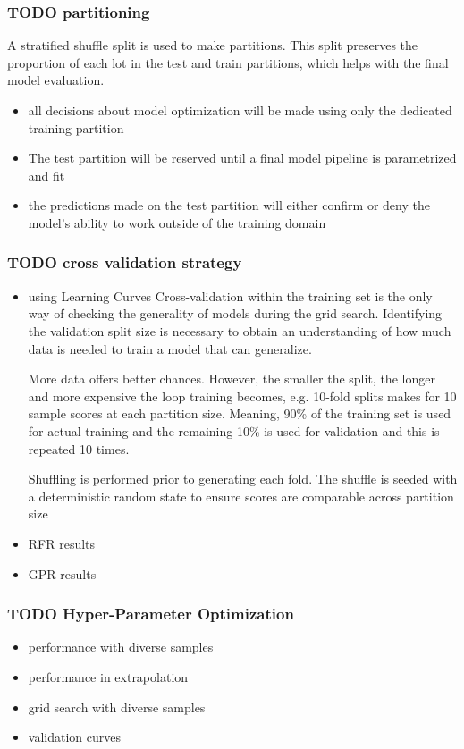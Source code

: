 \documentclass[aip, jmp, amsmath, amssymb]{revtex4-2}
\begin{document}
\subsubsection*{{\bfseries\sffamily TODO} partitioning}
\label{sec:orgfcd6ee8}
A stratified shuffle split is used to make partitions. This split
preserves the proportion of each \gls{lot} in the test and train
partitions, which helps with the final model evaluation.

\begin{itemize}
\item all decisions about model optimization will be made using only the
dedicated training partition
\item The test partition will be reserved until a final model pipeline is
parametrized and fit
\item the predictions made on the test partition will either confirm or
deny the model's ability to work outside of the training domain
\end{itemize}

\subsubsection*{{\bfseries\sffamily TODO} cross validation strategy}
\label{sec:org08b48c5}
\begin{itemize}
\item using Learning Curves
\label{sec:org18c93ee}
Cross-validation within the training set is the only way of checking
the generality of models during the grid search. Identifying the
validation split size is necessary to obtain an understanding of how
much data is needed to train a model that can generalize.

More data offers better chances. However, the smaller the split, the
longer and more expensive the loop training becomes, e.g. 10-fold
splits makes for 10 sample scores at each partition size. Meaning, 90\%
of the training set is used for actual training and the remaining 10\%
is used for validation and this is repeated 10 times.

Shuffling is performed prior to generating each fold. The shuffle is
seeded with a deterministic random state to ensure scores are
comparable across partition size

\item RFR results
\label{sec:org146bd9a}
\item GPR results
\label{sec:orgb861c55}
\end{itemize}
\subsubsection*{{\bfseries\sffamily TODO} Hyper-Parameter Optimization}
\label{sec:org9f250a6}
\begin{itemize}
\item performance with diverse samples
\label{sec:orgdb6eb76}
\item performance in extrapolation
\label{sec:org04b1263}
\item grid search with diverse samples
\label{sec:org92c34ab}
\item validation curves
\label{sec:orgdc6856f}
\end{itemize}
\end{document}
